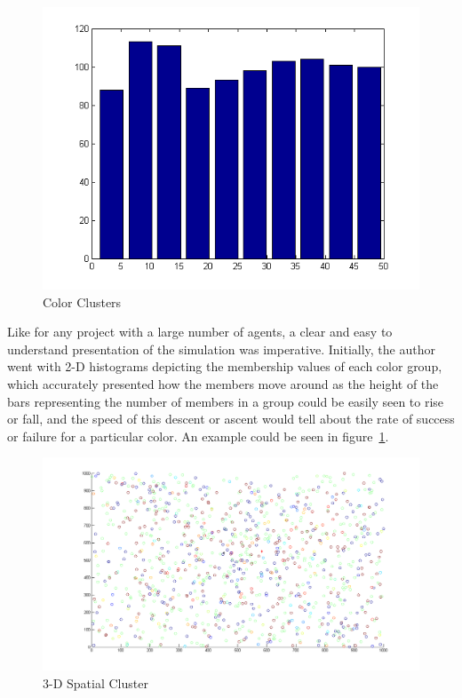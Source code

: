 \begin{figure}
\includegraphics[scale=1]{Figures/1000_agents_color_cluster}
\caption{Color Clusters}
\label{fig:color_clusters}
\end{figure}


Like for any project with a large number of agents, a clear and easy to understand presentation of the simulation was imperative.
Initially, the author went with 2-D histograms depicting the membership values of each color group, which accurately presented how the members move around as the height of the bars representing the number of members in a group could be easily seen to rise or fall, and the speed of this descent or ascent would tell about the rate of success or failure for a particular color. An example could be seen in figure~\ref{fig:color_clusters}.

\begin{figure}
\includegraphics[scale=0.5]{Figures/spatial}
\caption{3-D Spatial Cluster}
\label{fig:spatial_clusters}
\end{figure}



